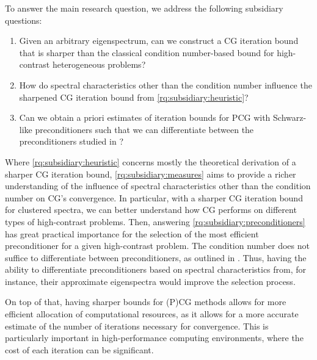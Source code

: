 \begin{subsidiaryq} \label{rq:subsidiaries}
    To answer the main research question, we address the following subsidiary questions:
    \setlength\itemindent{1in}
    \begin{enumerate}[label=\textbf{Q\arabic*}, ref=\textbf{Q\arabic*}, leftmargin=1cm]
        \item\label{rq:subsidiary:heuristic} Given an arbitrary eigenspectrum, can we construct a CG iteration bound that is sharper than the classical condition number-based bound for high-contrast heterogeneous problems?
        \item\label{rq:subsidiary:measures} How do spectral characteristics other than the condition number influence the sharpened CG iteration bound from \ref{rq:subsidiary:heuristic}?
        \item\label{rq:subsidiary:preconditioners} Can we obtain a priori estimates of iteration bounds for PCG with Schwarz-like preconditioners such that we can differentiate between the preconditioners studied in \cite{ams_coarse_space_comp_study_Alves2024}?
    \end{enumerate}
\end{subsidiaryq}

Where \ref{rq:subsidiary:heuristic} concerns mostly the theoretical derivation of a sharper CG iteration bound, \ref{rq:subsidiary:measures} aims to provide a richer understanding of the influence of spectral characteristics other than the condition number on CG's convergence. In particular, with a sharper CG iteration bound for clustered spectra, we can better understand how CG performs on different types of high-contrast problems. Then, answering \ref{rq:subsidiary:preconditioners} has great practical importance for the selection of the most efficient preconditioner for a given high-contrast problem. The condition number does not suffice to differentiate between preconditioners, as outlined in \cite{ams_coarse_space_comp_study_Alves2024}. Thus, having the ability to differentiate preconditioners based on spectral characteristics from, for instance, their approximate eigenspectra would improve the selection process.

On top of that, having sharper bounds for (P)CG methods allows for more efficient allocation of computational resources, as it allows for a more accurate estimate of the number of iterations necessary for convergence. This is particularly important in high-performance computing environments, where the cost of each iteration can be significant.

